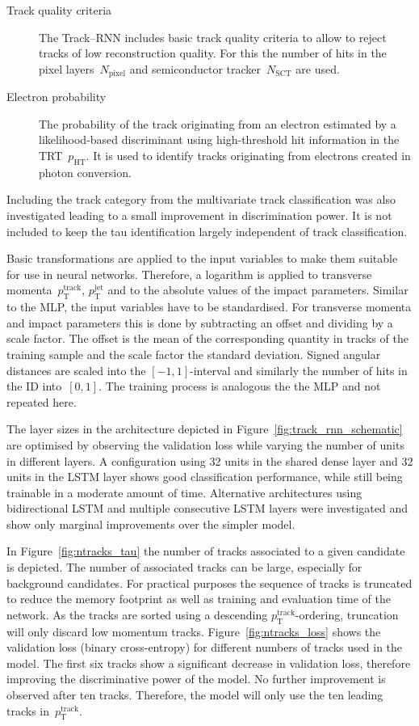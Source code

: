\begin{description}
\item[Track quality criteria] The Track--RNN includes basic track quality
  criteria to allow to reject tracks of low reconstruction quality. For this the
  number of hits in the pixel layers~$N_\text{pixel}$ and semiconductor
  tracker~$N_\text{SCT}$ are used.

\item[Electron probability] The probability of the track originating from an
  electron estimated by a likelihood-based discriminant using high-threshold hit
  information in the TRT~$p_\text{HT}$. It is used to identify tracks
  originating from electrons created in photon conversion.
\end{description}
Including the track category from the multivariate track classification was also
investigated leading to a small improvement in discrimination power. It is not
included to keep the tau identification largely independent of track
classification.

Basic transformations are applied to the input variables to make them suitable
for use in neural networks. Therefore, a logarithm is applied to transverse
momenta~$p_\text{T}^\text{track}$, $p_\text{T}^\text{jet}$ and to the absolute
values of the impact parameters. Similar to the MLP, the input variables have to
be standardised. For transverse momenta and impact parameters this is done by
subtracting an offset and dividing by a scale factor. The offset is the mean of
the corresponding quantity in tracks of the training sample and the scale factor
the standard deviation. Signed angular distances are scaled into the
$[-1, 1]$-interval and similarly the number of hits in the ID into~$[0, 1]$. The
training process is analogous the the MLP and not repeated here.

The layer sizes in the architecture depicted in
Figure~\ref{fig:track_rnn_schematic} are optimised by observing the validation
loss while varying the number of units in different layers. A configuration
using 32 units in the shared dense layer and 32 units in the LSTM layer shows
good classification performance, while still being trainable in a moderate
amount of time. Alternative architectures using bidirectional LSTM and multiple
consecutive LSTM layers were investigated and show only marginal improvements
over the simpler model.

In Figure~\ref{fig:ntracks_tau} the number of tracks associated to a given
\tauhadvis candidate is depicted. The number of associated tracks can be large,
especially for background candidates. For practical purposes the sequence of
tracks is truncated to reduce the memory footprint as well as training and
evaluation time of the network. As the tracks are sorted using a descending
$p_\text{T}^\text{track}$-ordering, truncation will only discard low momentum
tracks. Figure~\ref{fig:ntracks_loss} shows the validation loss (binary
cross-entropy) for different numbers of tracks used in the model. The first six
tracks show a significant decrease in validation loss, therefore improving the
discriminative power of the model. No further improvement is observed after ten
tracks. Therefore, the model will only use the ten leading tracks
in~$p_\text{T}^\text{track}$.

